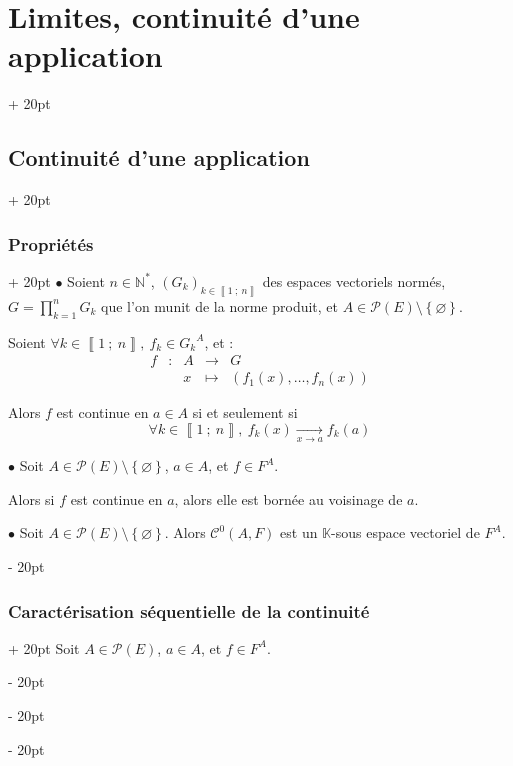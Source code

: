 \documentclass[a4paper, 12pt, twoside]{article}
\newcommand{\N}{\mathbb{N}} %
\newcommand{\K}{\mathbb K}
\newcommand{\nset}[2]{\left\llbracket #1\ ;\ #2 \right\rrbracket}
\newcommand{\tendsto}[1]{\xrightarrow[#1]{}}
\newcommand{\lr}[1]{\left( #1 \right)}
\newcommand{\set}[1]{\left\{ #1 \right\}}
\newcommand{\ind}[1][20pt]{\advance\leftskip + #1}
\newcommand{\deind}[1][20pt]{\advance\leftskip - #1}
\newenvironment{indt}[2][20pt]{#2 \par \ind[#1]}{\par \deind} %
\begin{document}
\begin{indt}{\section{Limites, continuité d'une application}}
\begin{indt}{\subsection{Continuité d'une application}}
            \vspace{12pt}
            
            \begin{indt}{\subsubsection{Propriétés}}
                $\bullet$ Soient $n \in \N^*$, $(G_k)_{k \in \nset 1 n}$ des espaces vectoriels normés, $\displaystyle G = \prod_{k = 1}^n G_k$ que l'on munit de la norme produit, et $A \in \mathcal P(E) \setminus \set \varnothing$.

                Soient $\forall k \in \nset 1 n,\ f_k \in {G_k}^A$, et :
                \[
                    \begin{array}{ccccc}
                        f & : & A & \longrightarrow & G
                        \\
                          && x & \longmapsto & \lr{f_1(x), \ldots, f_n(x)}
                    \end{array}
                \]

                Alors $f$ est continue en $a \in A$ si et seulement si
                \[
                    \forall k \in \nset 1 n,\
                    f_k(x) \tendsto{x \to a} f_k(a)
                \]

                \vspace{12pt}
                
                $\bullet$ Soit $A \in \mathcal P(E) \setminus \set \varnothing$, $a \in A$, et $f \in F^A$.

                Alors si $f$ est continue en $a$, alors elle est bornée au voisinage de $a$.

                \vspace{12pt}
                
                $\bullet$ Soit $A \in \mathcal P(E) \setminus \set \varnothing$. Alors $\mathcal C^0(A, F)$ est un $\K$-sous espace vectoriel de $F^A$.
            \end{indt}

            \vspace{12pt}
            
            \begin{indt}{\subsubsection{Caractérisation séquentielle de la continuité}}
                Soit $A \in \mathcal P(E)$, $a \in A$, et $f \in F^A$.


\end{indt}
\end{indt}
\end{indt}
\end{document}
